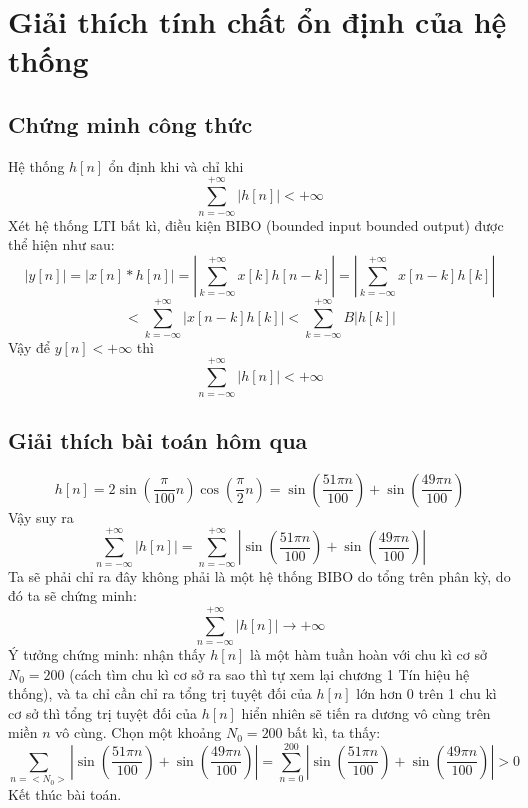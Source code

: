 \documentclass{article}
\begin{document}
\section*{Giải thích tính chất ổn định của hệ thống}
\subsection{Chứng minh công thức}
Hệ thống $h[n]$ ổn định khi và chỉ khi
$$\sum_{n=-\infty}^{+\infty}|h[n]|<+\infty$$
Xét hệ thống LTI bất kì, điều kiện BIBO (bounded input bounded output) được thể hiện như sau:
\begin{equation}
|y[n]|=|x[n]*h[n]|=\left|\sum_{k=-\infty}^{+\infty}x[k]h[n-k]\right|=\left|\sum_{k=-\infty}^{+\infty}x[n-k]h[k]\right|
\end{equation}
\begin{equation}
< \sum_{k=-\infty}^{+\infty}\left|x[n-k]h[k]\right|<\sum_{k=-\infty}^{+\infty}B|h[k]|
\end{equation}
Vậy để $y[n]<+\infty$ thì $$\sum_{n=-\infty}^{+\infty}|h[n]|<+\infty$$
\subsection{Giải thích bài toán hôm qua}
$$h[n]=2\sin{\left(\frac{\pi}{100}n\right)}\cos{\left(\frac{\pi}{2}n\right)}=\sin{\left(\frac{51\pi n}{100}\right)}+\sin{\left(\frac{49\pi n}{100}\right)}$$
Vậy suy ra
$$\sum_{n=-\infty}^{+\infty}|h[n]|=\sum_{n=-\infty}^{+\infty}\left|\sin{\left(\frac{51\pi n}{100}\right)}+\sin{\left(\frac{49\pi n}{100}\right)}\right|$$
Ta sẽ phải chỉ ra đây không phải là một hệ thống BIBO do tổng trên phân kỳ, do đó ta sẽ chứng minh:
$$\sum_{n=-\infty}^{+\infty}|h[n]|\rightarrow +\infty$$
Ý tưởng chứng minh: nhận thấy $h[n]$ là một hàm tuần hoàn với chu kì cơ sở $N_{0}=200$ (cách tìm chu kì cơ sở ra sao thì tự xem lại chương 1 Tín hiệu hệ thống), và
ta chỉ cần chỉ ra tổng trị tuyệt đối của $h[n]$ lớn hơn 0 trên 1 chu kì cơ sở thì tổng trị tuyệt đối của $h[n]$ hiển nhiên sẽ tiến ra dương vô cùng trên miền $n$ vô cùng.
Chọn một khoảng $N_{0}=200$ bất kì, ta thấy:
$$\sum_{n=<N_{0}>}^{}\left|\sin{\left(\frac{51\pi n}{100}\right)}+\sin{\left(\frac{49\pi n}{100}\right)}\right|=\sum_{n=0}^{200}\left|\sin{\left(\frac{51\pi n}{100}\right)}+\sin{\left(\frac{49\pi n}{100}\right)}\right|> 0$$ Kết thúc bài toán.
\end{document}
